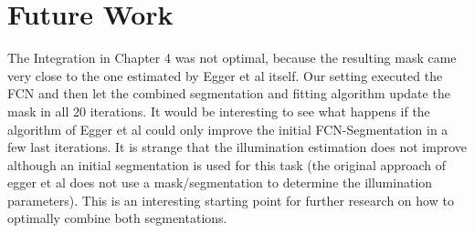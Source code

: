 
\section{Future Work}
The Integration in Chapter 4 was not optimal, because the resulting mask came very close to the one estimated by Egger et al itself. Our setting executed the FCN and then let the combined segmentation and fitting algorithm update the mask in all 20 iterations. It would be interesting to see what happens if the algorithm of Egger et al could only improve the initial FCN-Segmentation in a few last iterations. It is strange that the illumination estimation does not improve although an initial segmentation is used for this task (the original approach of egger et al does not use a mask/segmentation to determine the illumination parameters). This is an interesting starting point for further research on how to optimally combine both segmentations.